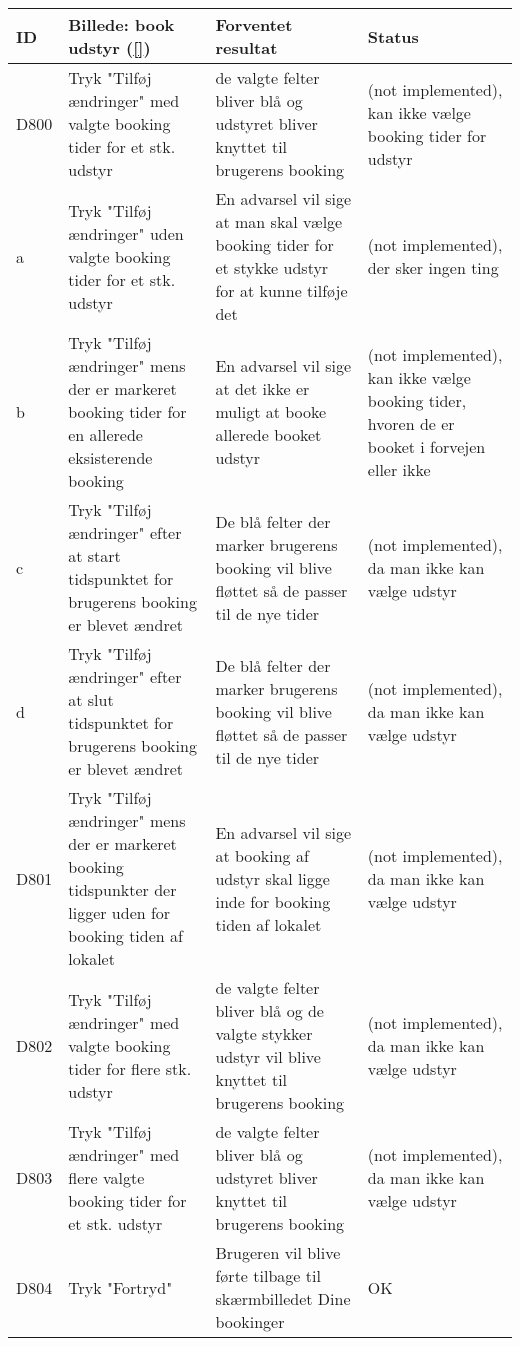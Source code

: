 \begin{longtable}{ |p{0.85cm}| p{7cm} | p{7.15cm} | p{1cm} | }
\hline
ID & Billede: book udstyr (\ref{})  & Forventet resultat & Status\\ 
\hline
D800 & Tryk "Tilføj ændringer" med valgte booking tider for et stk. udstyr & de valgte felter bliver blå og udstyret bliver knyttet til brugerens booking &(not implemented), kan ikke vælge booking tider for udstyr \\
\hline
a & Tryk "Tilføj ændringer" uden valgte booking tider for et stk. udstyr & En advarsel vil sige at man skal vælge booking tider for et stykke udstyr for at kunne tilføje det &(not implemented), der sker ingen ting \\
\hline
b & Tryk "Tilføj ændringer" mens der er markeret booking tider for en allerede eksisterende booking & En advarsel vil sige at det ikke er muligt at booke allerede booket udstyr &(not implemented), kan ikke vælge booking tider, hvoren de er booket i forvejen eller ikke \\
\hline
c & Tryk "Tilføj ændringer" efter at start tidspunktet for brugerens booking er blevet ændret & De blå felter der marker brugerens booking vil blive fløttet så de passer til de nye tider &(not implemented), da man ikke kan vælge udstyr  \\
\hline
d & Tryk "Tilføj ændringer" efter at slut tidspunktet for brugerens booking er blevet ændret & De blå felter der marker brugerens booking vil blive fløttet så de passer til de nye tider & (not implemented), da man ikke kan vælge udstyr\\
\hline
D801 & Tryk "Tilføj ændringer" mens der er markeret booking tidspunkter der ligger uden for booking tiden af lokalet & En advarsel vil sige at booking af udstyr skal ligge inde for booking tiden af lokalet & (not implemented), da man ikke kan vælge udstyr \\
\hline
D802 & Tryk "Tilføj ændringer" med valgte booking tider for flere stk. udstyr & de valgte felter bliver blå og de valgte stykker udstyr vil blive knyttet til brugerens booking & (not implemented), da man ikke kan vælge udstyr \\
\hline
D803 & Tryk "Tilføj ændringer" med flere valgte booking tider for et stk. udstyr & de valgte felter bliver blå og udstyret bliver knyttet til brugerens booking & (not implemented), da man ikke kan vælge udstyr\\
\hline
D804 & Tryk "Fortryd" & Brugeren vil blive førte tilbage til skærmbilledet Dine bookinger & OK \\
\hline
\end{longtable}

